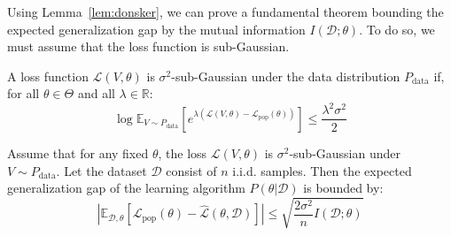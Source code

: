 Using Lemma~\ref{lem:donsker}, we can prove a fundamental theorem bounding the expected generalization gap by the mutual information $I(\mathcal{D}; \theta)$. To do so, we must assume that the loss function is sub-Gaussian.

\begin{definition}
A loss function $\mathcal{L}(V, \theta)$ is $\sigma^2$-sub-Gaussian under the data distribution $P_{\text{data}}$ if, for all $\theta \in \Theta$ and all $\lambda \in \mathbb{R}$:
\[ \log \mathbb{E}_{V \sim P_{\text{data}}} \left[ e^{\lambda (\mathcal{L}(V, \theta) - \mathcal{L}_{\text{pop}}(\theta))} \right] \leq \frac{\lambda^2 \sigma^2}{2} \]
\end{definition}

\begin{theorem} \label{thm:mi_bound}
Assume that for any fixed $\theta$, the loss $\mathcal{L}(V, \theta)$ is $\sigma^2$-sub-Gaussian under $V \sim P_{\text{data}}$. Let the dataset $\mathcal{D}$ consist of $n$ i.i.d. samples. Then the expected generalization gap of the learning algorithm $P(\theta | \mathcal{D})$ is bounded by:
\[ \left| \mathbb{E}_{\mathcal{D}, \theta} [ \mathcal{L}_{\text{pop}}(\theta) - \hat{\mathcal{L}}(\theta, \mathcal{D}) ] \right| \leq \sqrt{\frac{2 \sigma^2}{n} I(\mathcal{D}; \theta)} \]
\end{theorem}
